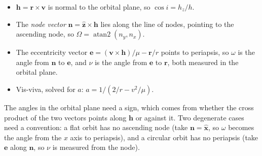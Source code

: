 \documentclass[
  10.5pt,
  letterpaper,
]{scrbook}
\providecommand{\tightlist}{%
  \setlength{\itemsep}{0pt}\setlength{\parskip}{0pt}}
\theoremstyle{definition}
\theoremstyle{plain}
\theoremstyle{remark}
\begin{document}
\begin{itemize}
\tightlist
\item
  \(\mathbf{h} = \mathbf{r}\times\mathbf{v}\) is normal to the orbital
  plane, so \(\cos i = h_z/h\).
\item
  The \emph{node vector}
  \(\mathbf{n} = \hat{\mathbf{z}}\times\mathbf{h}\) lies along the line
  of nodes, pointing to the ascending node, so
  \(\Omega = \operatorname{atan2}(n_y, n_x)\).
\item
  The eccentricity vector
  \(\mathbf{e} = (\mathbf{v}\times\mathbf{h})/\mu - \mathbf{r}/r\)
  points to periapsis, so \(\omega\) is the angle from \(\mathbf{n}\) to
  \(\mathbf{e}\), and \(\nu\) is the angle from \(\mathbf{e}\) to
  \(\mathbf{r}\), both measured in the orbital plane.
\item
  Vis-viva, solved for \(a\): \(a = 1/(2/r - v^2/\mu)\).
\end{itemize}

The angles in the orbital plane need a sign, which comes from whether
the cross product of the two vectors points along \(\mathbf{h}\) or
against it. Two degenerate cases need a convention: a flat orbit has no
ascending node (take \(\mathbf{n} = \hat{\mathbf{x}}\), so \(\omega\)
becomes the angle from the \(x\) axis to periapsis), and a circular
orbit has no periapsis (take \(\mathbf{e}\) along \(\mathbf{n}\), so
\(\nu\) is measured from the node).
\end{document}
